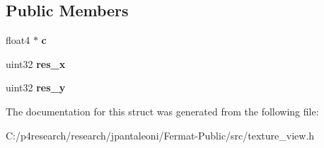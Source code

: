 \subsection*{Public Members}
\begin{DoxyCompactItemize}
\item 
\mbox{\label{struct_texture_view_affbb8e776bad8fec1b390612ff154900}} 
float4 $\ast$ {\bfseries c}
\item 
\mbox{\label{struct_texture_view_ab09e3b37307d2db5beda907636f88c7c}} 
uint32 {\bfseries res\+\_\+x}
\item 
\mbox{\label{struct_texture_view_afff89b76c2809b3f51014ad81acc3963}} 
uint32 {\bfseries res\+\_\+y}
\end{DoxyCompactItemize}


The documentation for this struct was generated from the following file\+:\begin{DoxyCompactItemize}
\item 
C\+:/p4research/research/jpantaleoni/\+Fermat-\/\+Public/src/texture\+\_\+view.\+h\end{DoxyCompactItemize}

